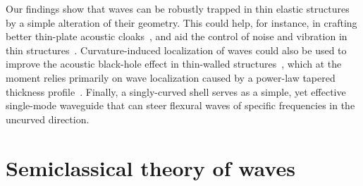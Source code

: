 Our findings show that waves can be robustly trapped in thin elastic structures by a simple alteration of their geometry.
This could help, for instance, in crafting better thin-plate acoustic cloaks~\cite{farhat2009}, and aid the control of noise and vibration in thin structures~\cite{mace1987,hansen2012}.
Curvature-induced localization of waves could also be used to improve the acoustic black-hole effect in thin-walled structures~\cite{lee2017,pelat2020}, which at the moment relies primarily on wave localization caused by a power-law tapered thickness profile~\cite{krylov2020}.
Finally, a singly-curved shell serves as a simple, yet effective single-mode waveguide that can steer flexural waves of specific frequencies in the uncurved direction.

\section{Semiclassical theory of waves}
\label{sec:wkb}


